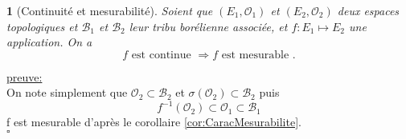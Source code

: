 \documentclass[8pt,notheorems]{beamer}
\newtheorem{corollary}{\translate{Corollaire}}
\theoremstyle{definition}
\theoremstyle{example}
\theoremstyle{mystyle}
\theoremstyle{plain}
\begin{document}
\begin{frame}[allowframebreaks]
\begin{corollary}[Continuité et mesurabilité]
Soient que $(E_1,\mathcal{O}_1)$ et $(E_2,\mathcal{O}_2)$ deux espaces topologiques et $\mathcal{B}_1$ et $\mathcal{B}_2$ leur tribu borélienne associée, et $f:E_1\mapsto E_2$ une application. On a
$$
f\text{ est continue }\Rightarrow f\text{ est mesurable }.
$$
\end{corollary}
\underline{preuve:}\\
On note simplement que $\mathcal{O}_{2}\subset \mathcal{B}_2$ et $\sigma(\mathcal{O}_{2})\subset \mathcal{B}_2$ puis
$$
f^{-1}(\mathcal{O}_{2})\subset \mathcal{O}_{1}\subset\mathcal{B}_{1}
$$
f est mesurable d'après le corollaire \ref{cor:CaracMesurabilite}.\\
$\square$

\end{frame}
\end{document}
